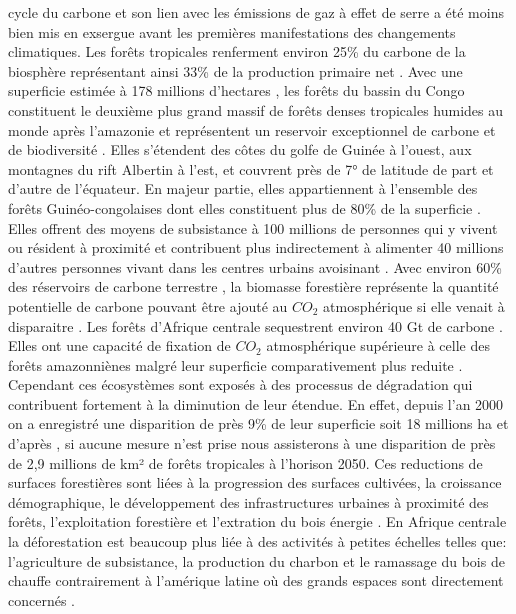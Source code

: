 \documentclass[
  12pt,
  a4paper,
  extrafontsizes,
  onecolumn,
  openright]{book}
\theoremstyle{definition}
\theoremstyle{definition}
\theoremstyle{definition}
\theoremstyle{definition}
\theoremstyle{remark}
\begin{document}
cycle du carbone et son lien avec les émissions de gaz à effet de serre a été moins bien mis en exsergue avant les premières manifestations des changements climatiques. Les forêts tropicales renferment environ 25\% du carbone de la biosphère représentant ainsi 33\% de la production primaire net \citep{Bonan2008}. Avec une superficie estimée à 178 millions d'hectares \citep{Vancutsem2021}, les forêts du bassin du Congo constituent le deuxième plus grand massif de forêts denses tropicales humides au monde après l'amazonie et représentent un reservoir exceptionnel de carbone et de biodiversité \citep{Ebaa2022}. Elles s'étendent des côtes du golfe de Guinée à l'ouest, aux montagnes du rift Albertin à l'est, et couvrent près de 7° de latitude de part et d'autre de l'équateur. En majeur partie, elles appartiennent à l'ensemble des forêts Guinéo-congolaises dont elles constituent plus de 80\% de la superficie \citep{Devers_Vande2006}. Elles offrent des moyens de subsistance à 100 millions de personnes qui y vivent ou résident à proximité \citep{Nasi2011} et contribuent plus indirectement à alimenter 40 millions d'autres personnes vivant dans les centres urbains avoisinant \citep{Ebaa2022}. Avec environ 60\% des réservoirs de carbone terrestre \citep{VanGoor_Martijn2019}, la biomasse forestière représente la quantité potentielle de carbone pouvant être ajouté au \(CO_2\) atmosphérique si elle venait à disparaitre \citep{Brown1997}. Les forêts d'Afrique centrale sequestrent environ 40 Gt de carbone \citep{Saatchi2011}. Elles ont une capacité de fixation de \(CO_2\) atmosphérique supérieure à celle des forêts amazonniènes malgré leur superficie comparativement plus reduite \citep{Hubau2020}. Cependant ces écosystèmes sont exposés à des processus de dégradation qui contribuent fortement à la diminution de leur étendue. En effet, depuis l'an 2000 on a enregistré une disparition de près 9\% de leur superficie soit 18 millions ha \citep{Ebaa2022}et d'après \citet{Seymour_Busch2016} , si aucune mesure n'est prise nous assisterons à une disparition de près de 2,9 millions de km² de forêts tropicales à l'horison 2050. Ces reductions de surfaces forestières sont liées à la progression des surfaces cultivées, la croissance démographique, le développement des infrastructures urbaines à proximité des forêts, l'exploitation forestière et l'extration du bois énergie \citep{Mayaux2013}.
En Afrique centrale la déforestation est beaucoup plus liée à des activités à petites échelles telles que: l'agriculture de subsistance, la production du charbon et le ramassage du bois de chauffe contrairement à l'amérique latine où des grands espaces sont directement concernés \citep{Curtis2018}.
\end{document}
